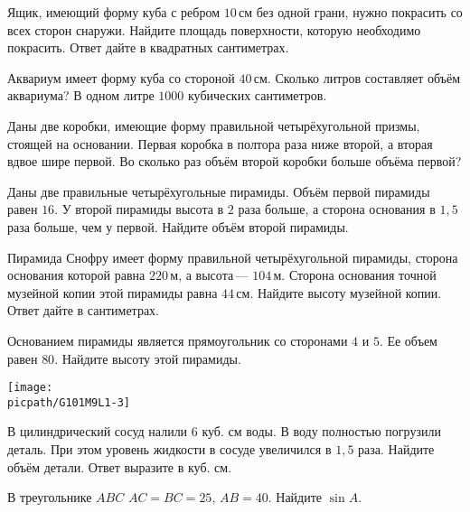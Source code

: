 \begin{homework}[number=4]
\begin{listofex}
		
		\item Ящик, имеющий форму куба с ребром \(10\) см без одной грани, нужно покрасить со всех сторон снаружи. Найдите площадь поверхности, которую необходимо покрасить. Ответ дайте в квадратных сантиметрах.
		\item Аквариум имеет форму куба со стороной \(40\) см. Сколько литров составляет объём аквариума? В одном литре \(1000\) кубических сантиметров.
		\item Даны две коробки, имеющие форму правильной четырёхугольной призмы, стоящей на основании. Первая коробка в полтора раза ниже второй, а вторая вдвое шире первой. Во сколько раз объём второй коробки больше объёма первой?
		\item Даны две правильные четырёхугольные пирамиды. Объём первой пирамиды равен \(16\). У второй пирамиды высота в \(2\) раза больше, а сторона основания в \(1,5\) раза больше, чем у первой. Найдите объём второй пирамиды.
		\item Пирамида Снофру имеет форму правильной четырёхугольной пирамиды, сторона основания которой равна \(220\) м, а высота --- \(104\) м. Сторона основания точной музейной копии этой пирамиды равна \(44\) см. Найдите высоту музейной копии. Ответ дайте в сантиметрах.
		\item 
		\begin{minipage}[t]{\bodywidth}
			Основанием пирамиды является прямоугольник со сторонами \(4\) и \(5\). Ее объем равен \(80\). Найдите высоту этой пирамиды.
		\end{minipage}
		\hspace{0.02\linewidth}
		\begin{minipage}[t]{\picwidth}
			\texttt{[image: \\picpath/G101M9L1-3]}
		\end{minipage}
		\item В цилиндрический сосуд налили \(6\) куб. см воды. В воду полностью погрузили деталь. При этом уровень жидкости в сосуде увеличился в \(1,5\) раза. Найдите объём детали. Ответ выразите в куб. см.
		\item В треугольнике \(ABC\) \(AC = BC = 25\), \(AB = 40\). Найдите \(\sin A\).
		
		
	\end{listofex}
\end{homework}
